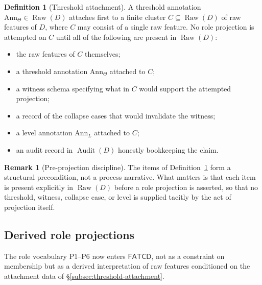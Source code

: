 \documentclass[11pt]{article}
\theoremstyle{definition}
\newtheorem{definition}[theorem]{Definition}
\newtheorem{remark}[theorem]{Remark}
\newcommand{\FATCD}{\ensuremath{\mathsf{FATCD}}}
\newcommand{\Raw}[1]{\ensuremath{\operatorname{Raw}\!\left(#1\right)}}
\newcommand{\Audit}[1]{\ensuremath{\operatorname{Audit}\!\left(#1\right)}}
\newcommand{\Pone}{\ensuremath{\mathrm{P1}}}
\newcommand{\Psix}{\ensuremath{\mathrm{P6}}}
\begin{document}
\begin{definition}[Threshold attachment]\label{def:threshold-attachment}
A threshold annotation \(\mathrm{Ann}_\Theta \in \Raw{D}\) attaches first to
a finite cluster \(C \subseteq \Raw{D}\) of raw features of \(D\), where \(C\)
may consist of a single raw feature. No role projection is attempted on \(C\)
until all of the following are present in \(\Raw{D}\):
\begin{itemize}[topsep=2pt,itemsep=1pt]
  \item the raw features of \(C\) themselves;
  \item a threshold annotation \(\mathrm{Ann}_\Theta\) attached to \(C\);
  \item a witness schema specifying what in \(C\) would support the attempted
    projection;
  \item a record of the collapse cases that would invalidate the witness;
  \item a level annotation \(\mathrm{Ann}_L\) attached to \(C\);
  \item an audit record in \(\Audit{D}\) honestly bookkeeping the claim.
\end{itemize}
\end{definition}

\begin{remark}[Pre-projection discipline]\label{rem:pre-projection}
The items of Definition~\ref{def:threshold-attachment} form a structural
precondition, not a process narrative. What matters is that each item is
present explicitly in \(\Raw{D}\) before a role projection is asserted, so
that no threshold, witness, collapse case, or level is supplied tacitly by
the act of projection itself.
\end{remark}

\subsection{Derived role projections}\label{subsec:derived-role-projections}

The role vocabulary \Pone{}--\Psix{} now enters \FATCD{}, not as a
constraint on membership but as a derived interpretation of raw
features conditioned on the attachment data of
\S\ref{subsec:threshold-attachment}.
\end{document}
